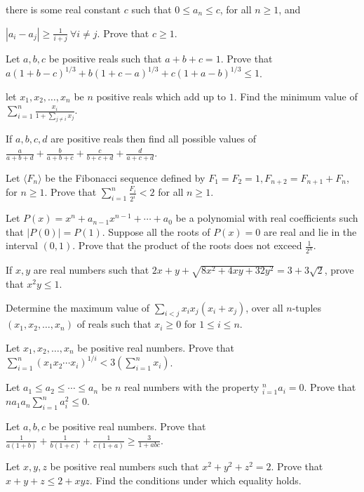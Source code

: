   \startitemize[n]
  \item there is some real constant $c$ such that $0\leq a_n\leq c$, for all $n\geq 1$, and
  \item $|a_i - a_j|\geq \frac{1}{i + j}~\forall i\neq j$.
  \stopitemize
  Prove that $c\geq 1$.
\item Let $a, b, c$ be positive reals such that $a + b + c = 1$. Prove that $a(1 + b - c)^{1/3} + b(1 + c - a)^{1/3} + c(1 + a -
  b)^{1/3}\leq 1$.
\item let $x_1, x_2, \ldots, x_n$ be $n$ positive reals which add up to $1$. Find the minimum value of $\displaystyle\sum_{i = 1}^n
  \frac{x_i}{1 + \sum_{j\neq i}x_j}$.
\item If $a, b, c, d$ are positive reals then find all possible values of $\frac{a}{a + b + d} + \frac{b}{a + b + c} + \frac{c}{b +
  c + d} + \frac{d}{a + c + d}$.
\item Let $\langle F_n\rangle$ be the Fibonacci sequence defined by $F_1 = F_2 = 1, F_{n + 2} = F_{n + 1} + F_n$, for $n\geq
  1$. Prove that $\displaystyle\sum_{i=1}^n\frac{F_i}{2^i} < 2$ for all $n\geq 1$.
\item Let $P(x) = x^n + a_{n - 1}x^{n - 1} + \cdots + a_0$ be a polynomial with real coefficients such that $|P(0)| =
  P(1)$. Suppose all the roots of $P(x) = 0$ are real and lie in the interval $(0, 1)$. Prove that the product of the roots does
  not exceed $\frac{1}{2^n}$.
\item If $x, y$ are real numbers such that $2x + y + \sqrt{8x^2 + 4xy + 32y^2} = 3 + 3\sqrt{2}$, prove that $x^2y \leq 1$.
\item Determine the maximum value of $\displaystyle\sum_{i < j}x_ix_j(x_i + x_j)$, over all $n$-tuples $(x_1, x_2, \ldots, x_n)$ of
  reals such that $x_i\geq 0$ for $1\leq i\leq n$.
\item Let $x_1, x_2, \ldots, x_n$ be positive real numbers. Prove that $\sum_{i=1}^n(x_1x_2\cdots x_i)^{1/i} <
  3\left(\displaystyle\sum_{i=1}^nx_i\right)$.
\item Let $a_1\leq a_2\leq \cdots\leq a_n$ be $n$ real numbers with the property $\displaystyle_{i=1}^na_i =
  0$. Prove that $na_1a_n\displaystyle\sum_{i=1}^na_i^2\leq 0$.
\item Let $a, b, c$ be positive real numbers. Prove that $\frac{1}{a(1 + b)} + \frac{1}{b(1 + c)} + \frac{1}{c(1 +
  a)}\geq \frac{3}{1 + abc}$.
\item Let $x, y, z$ be positive real numbers such that $x^2 + y^2 + z^2 = 2$. Prove that $x + y + z\leq 2 +
  xyz$. Find the conditions under which equality holds.
